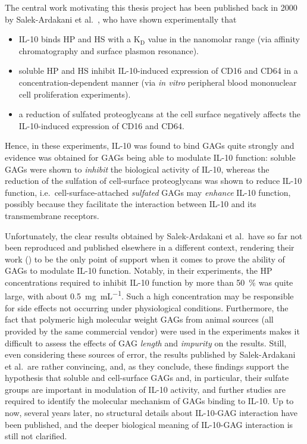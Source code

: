 The central work motivating this thesis project has been published back in 2000
by Salek-Ardakani et al.\ \cite{salek_ardakani_2000}, who have shown
experimentally that

\begin{itemize}
\item IL-10 binds HP and HS with a $\mathrm{K}_\mathrm{D}$
value in the nanomolar range (via affinity chromatography and surface plasmon
resonance).
\item soluble HP and HS inhibit IL-10-induced expression of CD16 and CD64 in a
concentration-dependent manner (via \textit{in vitro} peripheral blood
mononuclear cell proliferation experiments).
\item a reduction of sulfated proteoglycans at the cell surface negatively
affects the IL-10-induced expression of CD16 and CD64.
\end{itemize}

Hence, in these experiments, IL-10 was found to bind GAGs quite strongly and
evidence was obtained for GAGs being able to modulate IL-10 function: soluble
GAGs were shown to \textit{inhibit} the biological activity of IL-10, whereas
the reduction of the sulfation of cell-surface proteoglycans was shown to reduce
IL-10 function, i.e.\ cell-surface-attached \textit{sulfated} GAGs may
\textit{enhance} IL-10 function, possibly because they facilitate the
interaction between IL-10 and its transmembrane receptors.

Unfortunately, the clear results obtained by Salek-Ardakani et al.\ have so far
not been reproduced and published elsewhere in a different context, rendering
their work (\cite{salek_ardakani_2000}) to be the only point of support when it
comes to prove the ability of GAGs to modulate IL-10 function. Notably, in their
experiments, the HP concentrations required to inhibit IL-10 function by more
than \SI{50}{\percent} was quite large, with about
\SI{0.5}{\milli\gram\per\milli\liter}. Such a high concentration may be
responsible for side effects not occurring under physiological conditions.
Furthermore, the fact that polymeric high molecular weight GAGs from animal
sources (all provided by the same commercial vendor) were used in the
experiments makes it difficult to assess the effects of GAG \textit{length} and
\textit{impurity} on the results. Still, even considering these sources of
error, the results published by Salek-Ardakani et al.\ are rather convincing,
and, as they conclude, these findings support the hypothesis that soluble and
cell-surface GAGs and, in particular, their sulfate groups are important in
modulation of IL-10 activity, and further studies are required to identify the
molecular mechanism of GAGs binding to IL-10. Up to now, several years later, no
structural details about IL-10-GAG interaction have been published, and the
deeper biological meaning of IL-10-GAG interaction is still not clarified.

